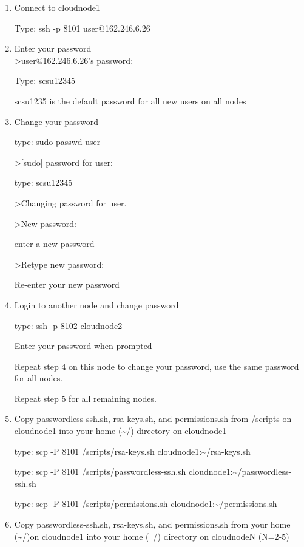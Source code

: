 \begin{enumerate}
\item Connect to cloudnode1

Type:  ssh -p 8101 user@162.246.6.26\\


\item Enter your password\\
\textgreater user@162.246.6.26's password:

Type:  scsu12345

scsu1235 is the default password for all new users on all nodes\\


\item Change your password

type:  sudo passwd user

\textgreater[sudo] password for user:

type: scsu12345

\textgreater Changing password for user.

\textgreater New password:

enter a new password

\textgreater Retype new password:

Re-enter your new password\\


\item Login to another node and change password

type:  ssh -p 8102 cloudnode2

Enter your password when prompted

Repeat step 4 on this node to change your password, use the same password for all nodes.

Repeat step 5 for all remaining nodes.\\


\item Copy passwordless-ssh.sh, rsa-keys.sh, and permissions.sh from /scripts on cloudnode1 into your home (\textasciitilde{}/) directory on cloudnode1

type:  scp -P 8101 /scripts/rsa-keys.sh cloudnode1:\textasciitilde{}/rsa-keys.sh

type:  scp -P 8101 /scripts/passwordless-ssh.sh cloudnode1:\textasciitilde{}/passwordless-ssh.sh

type:  scp -P 8101 /scripts/permissions.sh cloudnode1:\textasciitilde{}/permissions.sh\\


\item Copy passwordless-ssh.sh, rsa-keys.sh, and permissions.sh from your home (\textasciitilde{}/)on cloudnode1 into your home (~/) directory on cloudnodeN (N=2-5)


\end{enumerate}
